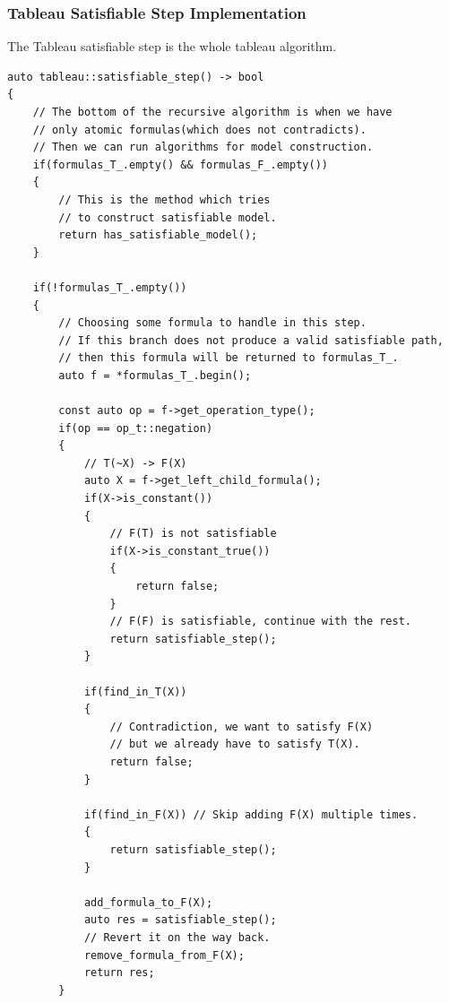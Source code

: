 \documentclass{article}
\begin{document}
	\subsubsection*{Tableau Satisfiable Step Implementation}
	The Tableau satisfiable step is the whole tableau algorithm.
\begin{lstlisting}
auto tableau::satisfiable_step() -> bool
{
    // The bottom of the recursive algorithm is when we have
    // only atomic formulas(which does not contradicts).
    // Then we can run algorithms for model construction.
    if(formulas_T_.empty() && formulas_F_.empty())
    {
        // This is the method which tries
        // to construct satisfiable model.
        return has_satisfiable_model();
    }

    if(!formulas_T_.empty())
    {
        // Choosing some formula to handle in this step.
        // If this branch does not produce a valid satisfiable path,
        // then this formula will be returned to formulas_T_.
        auto f = *formulas_T_.begin();

        const auto op = f->get_operation_type();
        if(op == op_t::negation)
        {
            // T(~X) -> F(X)
            auto X = f->get_left_child_formula();
            if(X->is_constant())
            {
                // F(T) is not satisfiable
                if(X->is_constant_true())
                {
                    return false;
                }
                // F(F) is satisfiable, continue with the rest.
                return satisfiable_step();
            }

            if(find_in_T(X))
            {
                // Contradiction, we want to satisfy F(X)
                // but we already have to satisfy T(X).
                return false;
            }

            if(find_in_F(X)) // Skip adding F(X) multiple times.
            {
                return satisfiable_step();
            }

            add_formula_to_F(X);
            auto res = satisfiable_step();
            // Revert it on the way back.
            remove_formula_from_F(X);
            return res;
        }
\end{lstlisting}
\newpage
\end{document}

